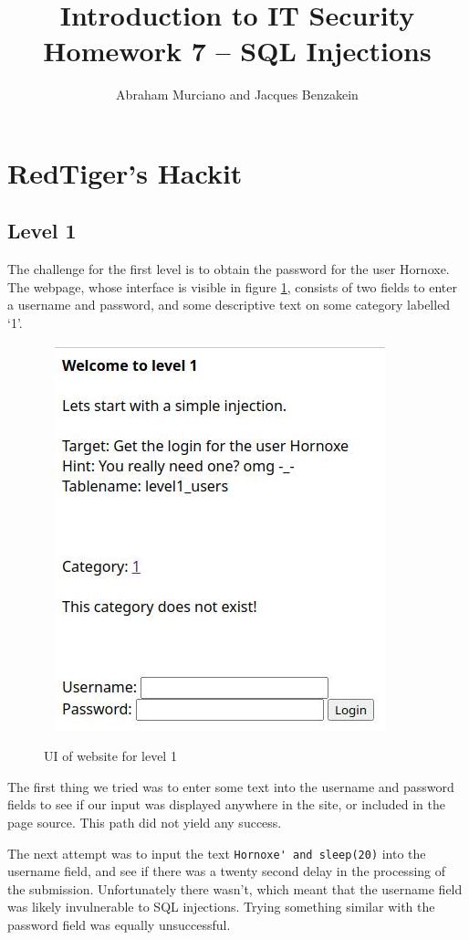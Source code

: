 \documentclass{article}
\title{Introduction to IT Security\\
\medskip
\large Homework 7 -- SQL Injections}
\author{Abraham Murciano and Jacques Benzakein}
\begin{document}
\maketitle

\section{RedTiger's Hackit}

\subsection{Level 1}

The challenge for the first level is to obtain the password for the user Hornoxe. The webpage, whose interface is visible in figure \ref{1.1.ui}, consists of two fields to enter a username and password, and some descriptive text on some category labelled `1'.

\begin{figure}[htbp]\
	\centering
	\includegraphics[scale=0.6]{1.1.ui.jpg}
	\caption{UI of website for level 1}
	\label{1.1.ui}
\end{figure}

The first thing we tried was to enter some text into the username and password fields to see if our input was displayed anywhere in the site, or included in the page source. This path did not yield any success.

The next attempt was to input the text \verb`Hornoxe' and sleep(20)` into the username field, and see if there was a twenty second delay in the processing of the submission. Unfortunately there wasn't, which meant that the username field was likely invulnerable to SQL injections. Trying something similar with the password field was equally unsuccessful.
\end{document}
